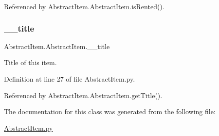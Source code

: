 Referenced by Abstract\+Item.\+Abstract\+Item.\+is\+Rented().

\mbox{\label{classAbstractItem_1_1AbstractItem_a2f4dc201ed6687e84b1b1b03863443c7}} 
\subsubsection{\texorpdfstring{\+\_\+\+\_\+title}{\_\_title}}
{\footnotesize\ttfamily Abstract\+Item.\+Abstract\+Item.\+\_\+\+\_\+title\hspace{0.3cm}{\ttfamily [private]}}



Title of this item. 



Definition at line 27 of file Abstract\+Item.\+py.



Referenced by Abstract\+Item.\+Abstract\+Item.\+get\+Title().



The documentation for this class was generated from the following file\+:\begin{DoxyCompactItemize}
\item 
\hyperlink{AbstractItem_8py}{Abstract\+Item.\+py}\end{DoxyCompactItemize}
